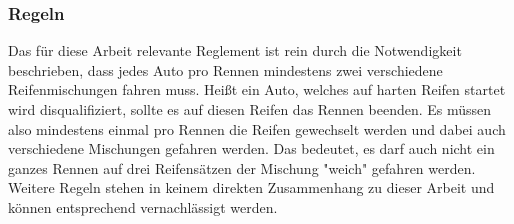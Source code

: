 \subsubsection{Regeln} %
Das für diese Arbeit relevante Reglement ist rein durch die Notwendigkeit beschrieben, dass jedes Auto pro Rennen mindestens zwei verschiedene Reifenmischungen fahren muss. Heißt ein Auto, welches auf harten Reifen startet wird disqualifiziert, sollte es auf diesen Reifen das Rennen beenden. Es müssen also mindestens einmal pro Rennen die Reifen gewechselt werden und dabei auch verschiedene Mischungen gefahren werden. Das bedeutet, es darf auch nicht ein ganzes Rennen auf drei Reifensätzen der Mischung "weich" gefahren werden.
Weitere Regeln stehen in keinem direkten Zusammenhang zu dieser Arbeit und können entsprechend vernachlässigt werden.

